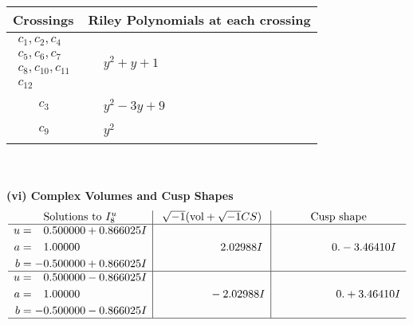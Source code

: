 \documentclass[1p]{elsarticle_modified}
\theoremstyle{definition}
\newcommand{\I}{\sqrt{-1}}
\begin{document}
\begin{tabular}{m{50pt}|m{274pt}}
Crossings & \hspace{64pt}Riley Polynomials at each crossing \\
\hline $$\begin{aligned}c_{1},c_{2},c_{4}\\c_{5},c_{6},c_{7}\\c_{8},c_{10},c_{11}\\c_{12}\end{aligned}$$&$\begin{aligned}
&y^2+y+1
\end{aligned}$\\
\hline $$\begin{aligned}c_{3}\end{aligned}$$&$\begin{aligned}
&y^2-3 y+9
\end{aligned}$\\
\hline $$\begin{aligned}c_{9}\end{aligned}$$&$\begin{aligned}
&y^2
\end{aligned}$\\
\hline
\end{tabular}\\~\\
\newpage\flushleft \textbf{(vi) Complex Volumes and Cusp Shapes}
$$\begin{array}{c|c|c}  
\text{Solutions to }I^u_{8}& \I (\text{vol} + \sqrt{-1}CS) & \text{Cusp shape}\\
 \hline 
\begin{aligned}
u &= \phantom{-}0.500000 + 0.866025 I \\
a &= \phantom{-}1.00000\phantom{ +0.000000I} \\
b &= -0.500000 + 0.866025 I\end{aligned}
 & \phantom{-0.000000 -}2.02988 I & \phantom{-0.000000 } 0. - 3.46410 I \\ \hline\begin{aligned}
u &= \phantom{-}0.500000 - 0.866025 I \\
a &= \phantom{-}1.00000\phantom{ +0.000000I} \\
b &= -0.500000 - 0.866025 I\end{aligned}
 & \phantom{-0.000000 } -2.02988 I & \phantom{-0.000000 -}0. + 3.46410 I\\
 \hline 
 \end{array}$$\newpage\newpage\renewcommand{\arraystretch}{1}
\end{document}
